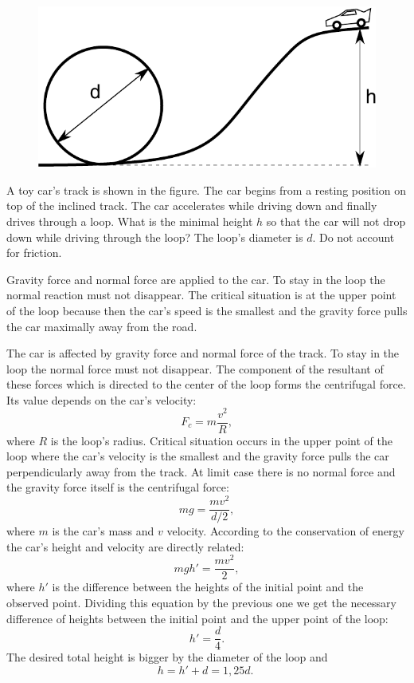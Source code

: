 {\ifEngStatement
\begin{figure}%
\includegraphics[width=\linewidth]{2012-v2g-05-silmus}%
\end{figure}
A toy car’s track is shown in the figure. The car begins from a resting position on top of the inclined track. The car accelerates while driving down and finally drives through a loop. What is the minimal height $h$ so that the car will not drop down while driving through the loop? The loop’s diameter is $d$. Do not account for friction.
\fi


\ifEngHint
Gravity force and normal force are applied to the car. To stay in the loop the normal reaction must not disappear. The critical situation is at the upper point of the loop because then the car’s speed is the smallest and the gravity force pulls the car maximally away from the road.
\fi


\ifEngSolution
The car is affected by gravity force and normal force of the track. To stay in the loop the normal force must not disappear. The component of the resultant of these forces which is directed to the center of the loop forms the centrifugal force. Its value depends on the car’s velocity:
\[F_c=m\frac{v^2}{R},\] 
where $R$ is the loop’s radius. Critical situation occurs in the upper point of the loop where the car’s velocity is the smallest and the gravity force pulls the car perpendicularly away from the track. At limit case there is no normal force and the gravity force itself is the centrifugal force:
\[ mg=\frac{mv^2}{d/2},\] 
where $m$ is the car’s mass and $v$ velocity. According to the conservation of energy the car’s height and velocity are directly related:
\[ mgh'=\frac{mv^2}{2},\]
where $h'$ is the difference between the heights of the initial point and the observed point. Dividing this equation by the previous one we get the necessary difference of heights between the initial point and the upper point of the loop:
\[ h'=\frac{d}{4}.\]
The desired total height is bigger by the diameter of the loop and
\[ h=h'+d=1,25d.\;\]
\fi
}